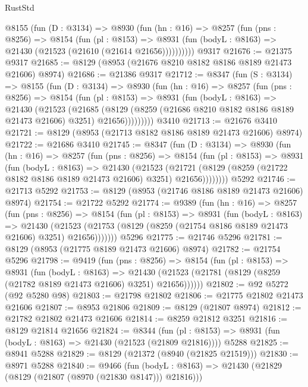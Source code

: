 \begin{lexlean}{RustStd}
\begin{coremodule}
      @8155
        (fun (D : @3134) =>
        @8930
          (fun (hn : @16) =>
          @8257
            (fun (pns : @8256) =>
            @8154
              (fun (pl : @8153) =>
              @8931 (fun (bodyL : @8163) => @21430 (@21523 (@21610 (@21614 @21656))))))))))
    @9317
@21676 := @21375 @9317
@21685 := @8129 (@8953 (@21676 @8210 @8182 @8186 @8189 @21473 @21606) @8974)
@21686 := @21386 @9317
@21712 := @8347
    (fun (S : @3134) =>
    @8155
      (fun (D : @3134) =>
      @8930
        (fun (hn : @16) =>
        @8257
          (fun (pns : @8256) =>
          @8154
            (fun (pl : @8153) =>
            @8931
              (fun (bodyL : @8163) =>
              @21430
                (@21523
                  (@21685
                    (@8129
                      (@8259 (@21686 @8210 @8182 @8186 @8189 @21473 @21606) @3251)
                      @21656)))))))))
    @3410
@21713 := @21676 @3410
@21721 := @8129 (@8953 (@21713 @8182 @8186 @8189 @21473 @21606) @8974)
@21722 := @21686 @3410
@21745 := @8347
    (fun (D : @3134) =>
    @8930
      (fun (hn : @16) =>
      @8257
        (fun (pns : @8256) =>
        @8154
          (fun (pl : @8153) =>
          @8931
            (fun (bodyL : @8163) =>
            @21430
              (@21523
                (@21721 (@8129 (@8259 (@21722 @8182 @8186 @8189 @21473 @21606) @3251) @21656))))))))
    @5292
@21746 := @21713 @5292
@21753 := @8129 (@8953 (@21746 @8186 @8189 @21473 @21606) @8974)
@21754 := @21722 @5292
@21774 := @9389
    (fun (hn : @16) =>
    @8257
      (fun (pns : @8256) =>
      @8154
        (fun (pl : @8153) =>
        @8931
          (fun (bodyL : @8163) =>
          @21430
            (@21523 (@21753 (@8129 (@8259 (@21754 @8186 @8189 @21473 @21606) @3251) @21656)))))))
    @5296
@21775 := @21746 @5296
@21781 := @8129 (@8953 (@21775 @8189 @21473 @21606) @8974)
@21782 := @21754 @5296
@21798 := @9419
    (fun (pns : @8256) =>
    @8154
      (fun (pl : @8153) =>
      @8931
        (fun (bodyL : @8163) =>
        @21430 (@21523 (@21781 (@8129 (@8259 (@21782 @8189 @21473 @21606) @3251) @21656))))))
@21802 := @92 @5272 (@92 @5280 @98)
@21803 := @21798 @21802
@21806 := @21775 @21802 @21473 @21606
@21807 := @8953 @21806
@21809 := @8129 (@21807 @8974)
@21812 := @21782 @21802 @21473 @21606
@21814 := @8259 @21812 @3251
@21816 := @8129 @21814 @21656
@21824 := @8344
    (fun (pl : @8153) => @8931 (fun (bodyL : @8163) => @21430 (@21523 (@21809 @21816))))
    @5288
@21825 := @8941 @5288
@21829 := @8129 (@21372 (@8940 (@21825 @21519)))
@21830 := @8971 @5288
@21840 := @9466
    (fun (bodyL : @8163) => @21430 (@21829 (@8129 (@21807 (@8970 (@21830 @8147))) @21816)))

\end{coremodule}
\end{lexlean}
